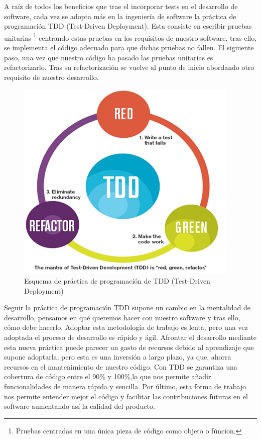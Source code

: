 A raíz de todos los beneficios que trae el incorporar tests en el desarrollo de software, cada vez se adopta más en la ingeniería de software la práctica de programación TDD (Test-Driven Deployment). Esta consiste en escribir pruebas unitarias \footnote{Pruebas centradas en una única pieza de código como objeto o fúncion.} centrando estas pruebas en los requisitos de nuestro software, tras ello, se implementa el código adecuado para que dichas pruebas no fallen. El siguiente paso, una vez que nuestro código ha pasado las pruebas unitarias es refactorizarlo. Tras su refactorización se vuelve al punto de inicio abordando otro requisito de nuestro desarrollo. \\
\begin{figure}[h]
    \centering
    \includegraphics[scale=0.8]{img/TDD__logo.jpg}
    \caption{Esquema de práctica de programación de TDD (Test-Driven Deployment)}
    \label{fig:tdd}
\end{figure}
Seguir la práctica de programación TDD supone un cambio en la mentalidad de desarrollo, pensamos en qué queremos hacer con nuestro software y tras ello, cómo debe hacerlo. Adoptar esta metodología de trabajo es lenta, pero una vez adoptada el proceso de desarrollo es rápido y ágil. Afrontar el desarrollo mediante esta nueva práctica puede parecer un gasto de recursos debido al aprendizaje que supone adoptarla, pero esta es una inversión a largo plazo, ya que, ahorra recursos en el mantenimiento de nuestro código. Con TDD se garantiza una cobertura de código entre el 90\% y 100\%,lo que nos permite añadir funcionalidades de manera rápida y sencilla. Por último, esta forma de trabajo nos permite entender mejor el código y facilitar las contribuciones futuras en el software aumentando así la calidad del producto. 
